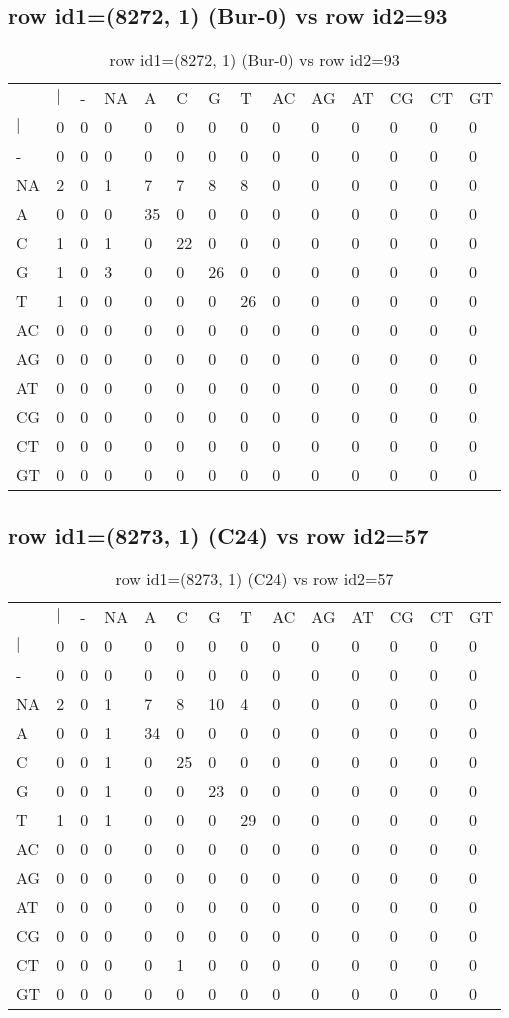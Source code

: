 \subsection{row id1=(8272, 1) (Bur-0) vs row id2=93}
\begin{center}
\begin{longtable}{|l|l|l|l|l|l|l|l|l|l|l|l|l|l|}
\caption{row id1=(8272, 1) (Bur-0) vs row id2=93} \label{table_dm426}\\
\hline
\\
\hline
&$|$&-&NA&A&C&G&T&AC&AG&AT&CG&CT&GT\\
$|$&0&0&0&0&0&0&0&0&0&0&0&0&0\\
-&0&0&0&0&0&0&0&0&0&0&0&0&0\\
NA&2&0&1&7&7&8&8&0&0&0&0&0&0\\
A&0&0&0&35&0&0&0&0&0&0&0&0&0\\
C&1&0&1&0&22&0&0&0&0&0&0&0&0\\
G&1&0&3&0&0&26&0&0&0&0&0&0&0\\
T&1&0&0&0&0&0&26&0&0&0&0&0&0\\
AC&0&0&0&0&0&0&0&0&0&0&0&0&0\\
AG&0&0&0&0&0&0&0&0&0&0&0&0&0\\
AT&0&0&0&0&0&0&0&0&0&0&0&0&0\\
CG&0&0&0&0&0&0&0&0&0&0&0&0&0\\
CT&0&0&0&0&0&0&0&0&0&0&0&0&0\\
GT&0&0&0&0&0&0&0&0&0&0&0&0&0\\
\hline
\end{longtable}
\end{center}

\subsection{row id1=(8273, 1) (C24) vs row id2=57}
\begin{center}
\begin{longtable}{|l|l|l|l|l|l|l|l|l|l|l|l|l|l|}
\caption{row id1=(8273, 1) (C24) vs row id2=57} \label{table_dm428}\\
\hline
\\
\hline
&$|$&-&NA&A&C&G&T&AC&AG&AT&CG&CT&GT\\
$|$&0&0&0&0&0&0&0&0&0&0&0&0&0\\
-&0&0&0&0&0&0&0&0&0&0&0&0&0\\
NA&2&0&1&7&8&10&4&0&0&0&0&0&0\\
A&0&0&1&34&0&0&0&0&0&0&0&0&0\\
C&0&0&1&0&25&0&0&0&0&0&0&0&0\\
G&0&0&1&0&0&23&0&0&0&0&0&0&0\\
T&1&0&1&0&0&0&29&0&0&0&0&0&0\\
AC&0&0&0&0&0&0&0&0&0&0&0&0&0\\
AG&0&0&0&0&0&0&0&0&0&0&0&0&0\\
AT&0&0&0&0&0&0&0&0&0&0&0&0&0\\
CG&0&0&0&0&0&0&0&0&0&0&0&0&0\\
CT&0&0&0&0&1&0&0&0&0&0&0&0&0\\
GT&0&0&0&0&0&0&0&0&0&0&0&0&0\\
\hline
\end{longtable}
\end{center}

